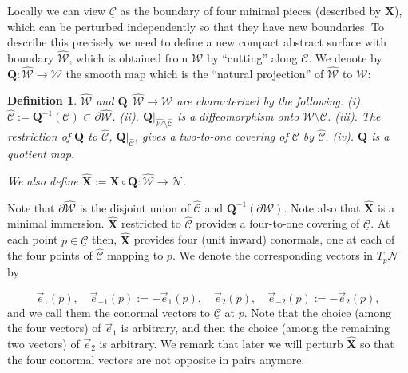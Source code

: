 \documentclass[12pt,namelimits,sumlimits]{amsart}
\newtheorem{definition}[theorem]{Definition}
\theoremstyle{remark}
\numberwithin{equation}{section}
\begin{document}
Locally we can view ${\underline{{\mathcal{C}}}}$ as the boundary of four minimal pieces (described by ${\boldsymbol{X}}$),
which can be perturbed independently so that they have new boundaries.
To describe this precisely we need to define a new compact abstract surface with boundary ${{\widehat{{\mathcal{W}}}}}$,
which is obtained from ${{\mathcal{W}}}$ by ``cutting'' along ${{\mathcal{C}}}$.
We denote by ${\boldsymbol{Q}}:{{\widehat{{\mathcal{W}}}}}\to{{\mathcal{W}}}$ the smooth map which is the ``natural projection'' of ${{\widehat{{\mathcal{W}}}}}$ to ${{\mathcal{W}}}$:

\addtocounter{equation}{1}
\begin{definition}
\label{DWhat}
${{\widehat{{\mathcal{W}}}}}$ and ${\boldsymbol{Q}}:{{\widehat{{\mathcal{W}}}}}\to{{\mathcal{W}}}$ are characterized by the following:
\newline
(i). ${{\widehat{{\mathcal{C}}}}}:={\boldsymbol{Q}}^{-1}({{\mathcal{C}}})\subset\partial{{\widehat{{\mathcal{W}}}}}$.
\newline
(ii). $\left.{\boldsymbol{Q}}\right|_{{{\widehat{{\mathcal{W}}}}}\setminus{{\widehat{{\mathcal{C}}}}}}$ is a diffeomorphism
onto ${{\mathcal{W}}}\setminus{{\mathcal{C}}}$.
\newline
(iii). The restriction of ${\boldsymbol{Q}}$ to ${{\widehat{{\mathcal{C}}}}}$,
$\left.{\boldsymbol{Q}}\right|_{{\widehat{{\mathcal{C}}}}}$,
gives a two-to-one covering of ${{\mathcal{C}}}$ by ${{\widehat{{\mathcal{C}}}}}$.
\newline
(iv).
${\boldsymbol{Q}}$ is a quotient map.

We also define ${\widehat{\boldsymbol{X}}}:={\boldsymbol{X}} \circ {\boldsymbol{Q}}:{{\widehat{{\mathcal{W}}}}}\to{{\mathcal{N}}}$.
\end{definition}

Note that $\partial{{\widehat{{\mathcal{W}}}}}$ is the disjoint union of ${{\widehat{{\mathcal{C}}}}}$ and ${\boldsymbol{Q}}^{-1}(\partial{{\mathcal{W}}})$.
Note also that ${\widehat{\boldsymbol{X}}}$ is a minimal immersion.
${\widehat{\boldsymbol{X}}}$ restricted to ${{\widehat{{\mathcal{C}}}}}$ provides a four-to-one covering of ${\underline{{\mathcal{C}}}}$.
At each point $p\in{\underline{{\mathcal{C}}}}$ then, ${\widehat{\boldsymbol{X}}}$ provides four (unit inward)
conormals, one at each of the
four points of ${{\widehat{{\mathcal{C}}}}}$ mapping to $p$.
We denote the corresponding vectors in $T_p{{\mathcal{N}}}$ by
\addtocounter{theorem}{1}
\begin{equation}
\label{Evectors}
{\vec{e}}_{1}(p),\quad
{\vec{e}}_{-1}(p):=-{\vec{e}}_1(p),\quad
{\vec{e}}_{2}(p),\quad
{\vec{e}}_{-2}(p):=-{\vec{e}}_2(p),
\end{equation}
and we call them the conormal vectors to ${\underline{{\mathcal{C}}}}$ at $p$.
Note that the choice (among the four vectors)
of ${\vec{e}}_1$ is arbitrary, 
and then the choice (among the remaining two vectors) of ${\vec{e}}_2$ is arbitrary.
We remark that later we will perturb ${\widehat{\boldsymbol{X}}}$ so that the four conormal vectors are not opposite
in pairs anymore.
\end{document}
